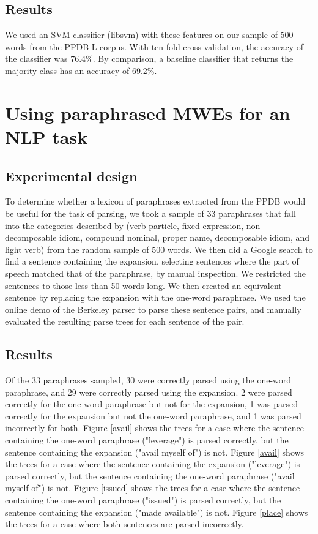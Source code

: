 \documentclass[11pt]{article}
\begin{document}
\begin{itemize}
\subsection{Results}

We used an SVM classifier (libsvm) with these features on our sample of 500 words from the PPDB L corpus. With ten-fold cross-validation, the accuracy of the classifier was 76.4\%. By comparison, a baseline classifier that returns the majority class has an accuracy of 69.2\%. 

\section{Using paraphrased MWEs for an NLP task}

\subsection{Experimental design}

To determine whether a lexicon of paraphrases extracted from the PPDB would be useful for the task of parsing, we took a sample of 33 paraphrases that fall into the categories described by  (verb particle, fixed expression, non-decomposable idiom, compound nominal, proper name, decomposable idiom, and light verb) from the random sample of 500 words. We then did a Google search to find a sentence containing the expansion, selecting sentences where the part of speech matched that of the paraphrase, by manual inspection. We restricted the sentences to those less than 50 words long. We then created an equivalent sentence by replacing the expansion with the one-word paraphrase. We used the online demo of the Berkeley parser \cite{petrov-EtAl:2006:COLACL} to parse these sentence pairs, and manually evaluated the resulting parse trees for each sentence of the pair.

\subsection{Results}

Of the 33 paraphrases sampled, 30 were correctly parsed using the one-word paraphrase, and 29 were correctly parsed using the expansion. 2 were parsed correctly for the one-word paraphrase but not for the expansion, 1 was parsed correctly for the expansion but not the one-word paraphrase, and 1 was parsed incorrectly for both. Figure \ref{avail} shows the trees for a case where the sentence containing the one-word paraphrase ("leverage") is parsed correctly, but the sentence containing the expansion ("avail myself of") is not. Figure \ref{avail} shows the trees for a case where the sentence containing the expansion ("leverage") is parsed correctly, but the sentence containing the one-word paraphrase ("avail myself of") is not. Figure \ref{issued} shows the trees for a case where the sentence containing the one-word paraphrase ("issued") is parsed correctly, but the sentence containing the expansion ("made available") is not. Figure \ref{place} shows the trees for a case where both sentences are parsed incorrectly.


\end{itemize}
\end{document}
